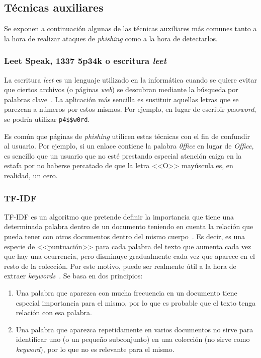 \subsection{Técnicas auxiliares}

Se exponen a continuación algunas de las técnicas auxiliares más comunes tanto a la hora de realizar ataques de \textit{phishing} como a la hora de detectarlos.

\subsubsection{Leet Speak, 1337 5p34k o escritura \textit{leet}}

La escritura \textit{leet} es un lenguaje utilizado en la informática cuando se quiere evitar que ciertos archivos (o páginas \textit{web}) se descubran mediante la búsqueda por palabras clave~\cite{leetSpectrum}. La aplicación más sencilla es sustituir aquellas letras que se parezcan a números por estos mismos. Por ejemplo, en lugar de escribir \textit{password}, se podría utilizar \texttt{p4\$\$w0rd}.

Es común que páginas de \textit{phishing} utilicen estas técnicas con el fin de confundir al usuario. Por ejemplo, si un enlace contiene la palabra \textit{0ffice} en lugar de \textit{Office}, es sencillo que un usuario que no esté prestando especial atención caiga en la estafa por no haberse percatado de que la letra <<O>> mayúscula es, en realidad, un cero.

\subsubsection{TF-IDF}

TF-IDF es un algoritmo que pretende definir la importancia que tiene una determinada palabra dentro de un documento teniendo en cuenta la relación que pueda tener con otros documentos dentro del mismo cuerpo~\cite{tfidfmarius2020}. Es decir, es una especie de <<puntuación>> para cada palabra del texto que aumenta cada vez que hay una ocurrencia, pero disminuye gradualmente cada vez que aparece en el resto de la colección. Por este motivo, puede ser realmente útil a la hora de extraer \textit{keywords}~\cite{cantinatfidf}. Se basa en dos principios:

\begin{enumerate}
	\item Una palabra que aparezca con mucha frecuencia en un documento tiene especial importancia para el mismo, por lo que es probable que el texto tenga relación con esa palabra.
	\item Una palabra que aparezca repetidamente en varios documentos no sirve para identificar uno (o un pequeño subconjunto) en una colección (no sirve como \textit{keyword}), por lo que no es relevante para el mismo.
\end{enumerate}

